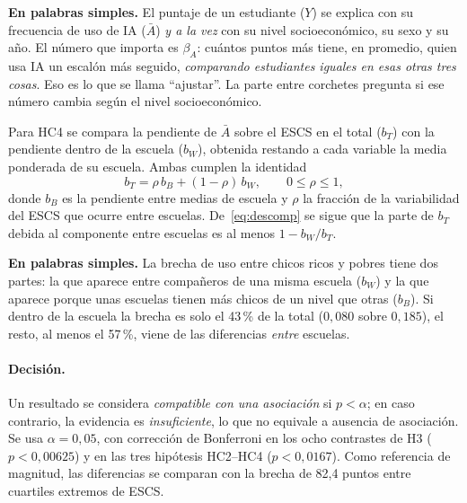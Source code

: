 \documentclass[11pt,a4paper]{article}
\begin{document}
\begin{explica}
\textbf{En palabras simples.} El puntaje de un estudiante ($Y$) se explica con su frecuencia de uso de IA ($\bar A$) \emph{y a la vez} con su nivel socioeconómico, su sexo y su año. El número que importa es $\beta_A$: cuántos puntos más tiene, en promedio, quien usa IA un escalón más seguido, \emph{comparando estudiantes iguales en esas otras tres cosas}. Eso es lo que se llama \enquote{ajustar}. La parte entre corchetes pregunta si ese número cambia según el nivel socioeconómico.
\end{explica}

\noindent Para HC4 se compara la pendiente de $\bar A$ sobre el ESCS en el total ($b_T$) con la pendiente dentro de la escuela ($b_W$), obtenida restando a cada variable la media ponderada de su escuela. Ambas cumplen la identidad
\begin{equation}\label{eq:descomp}
b_T=\rho\,b_B+(1-\rho)\,b_W,\qquad 0\le\rho\le1,
\end{equation}
donde $b_B$ es la pendiente entre medias de escuela y $\rho$ la fracción de la variabilidad del ESCS que ocurre entre escuelas. De~\eqref{eq:descomp} se sigue que la parte de $b_T$ debida al componente entre escuelas es al menos $1-b_W/b_T$.

\begin{explica}
\textbf{En palabras simples.} La brecha de uso entre chicos ricos y pobres tiene dos partes: la que aparece entre compañeros de una misma escuela ($b_W$) y la que aparece porque unas escuelas tienen más chicos de un nivel que otras ($b_B$). Si dentro de la escuela la brecha es solo el 43\,\% de la total ($0{,}080$ sobre $0{,}185$), el resto, al menos el 57\,\%, viene de las diferencias \emph{entre} escuelas.
\end{explica}

\paragraph{Decisión.} Un resultado se considera \emph{compatible con una asociación} si $p<\alpha$; en caso contrario, la evidencia es \emph{insuficiente}, lo que no equivale a ausencia de asociación. Se usa $\alpha=0{,}05$, con corrección de Bonferroni en los ocho contrastes de H3 ($p<0{,}00625$) y en las tres hipótesis HC2--HC4 ($p<0{,}0167$). Como referencia de magnitud, las diferencias se comparan con la brecha de 82,4 puntos entre cuartiles extremos de ESCS.

\end{document}
